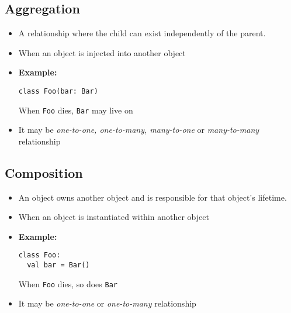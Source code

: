 \documentclass{article}
\begin{document}
\subsection{Aggregation}
\begin{itemize}
    \item  A relationship where the child can exist independently of the parent.
    \item When an object is injected into another object
    \item \textbf{Example:}
          \begin{verbatim}
class Foo(bar: Bar)
          \end{verbatim}
          When \lstinline|Foo| dies, \lstinline|Bar| may live on
          \item It may be \textit{one-to-one, one-to-many, many-to-one} or \textit{many-to-many} relationship
\end{itemize}
\subsection{Composition}
\begin{itemize}
    \item An object owns another object and is responsible for that object's lifetime.
    \item When an object is instantiated within another object
    \item \textbf{Example:}
          \begin{verbatim}
class Foo:
  val bar = Bar()
          \end{verbatim}
          When \lstinline|Foo| dies, so does \lstinline|Bar|
          \item It may be \textit{one-to-one} or \textit{one-to-many} relationship
\end{itemize}
\newpage
\printindex
\end{document}

